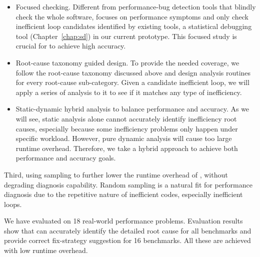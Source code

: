 \begin{itemize}
\item Focused checking. 
Different from performance-bug detection tools that blindly check the whole
software, \Tool focuses on performance symptoms and only check inefficient
loop candidates identified by existing tools, a statistical debugging
tool (Chapter~\ref{chap:sd}) in our current prototype. 
This focused study is crucial for \Tool to achieve high
accuracy.

\item Root-cause taxonomy guided design. To provide the needed coverage, we follow
the root-cause taxonomy discussed above and design analysis routines for 
every root-cause sub-category. Given a candidate inefficient loop, we will 
apply a series of analysis to it to see if it matches any type of inefficiency.

\item Static-dynamic hybrid analysis to balance performance and accuracy.
As we will see, static analysis alone cannot accurately identify 
inefficiency root causes, especially because some inefficiency problems only
happen under specific workload. However, pure dynamic analysis will 
cause too large 
runtime overhead. Therefore, we take a hybrid approach to achieve both
performance and accuracy goals.
\end{itemize}

Third, using sampling to further lower the runtime overhead of \Tool, without
degrading diagnosis capability. Random sampling is a natural fit for performance
diagnosis due to the repetitive nature of inefficient codes, especially
inefficient loops.

We have evaluated \Tool on 18 real-world performance problems. 
Evaluation results show that \Tool can accurately identify the detailed
root cause for all benchmarks and provide correct fix-strategy suggestion for
16 benchmarks. All these are achieved with low runtime overhead.

 

